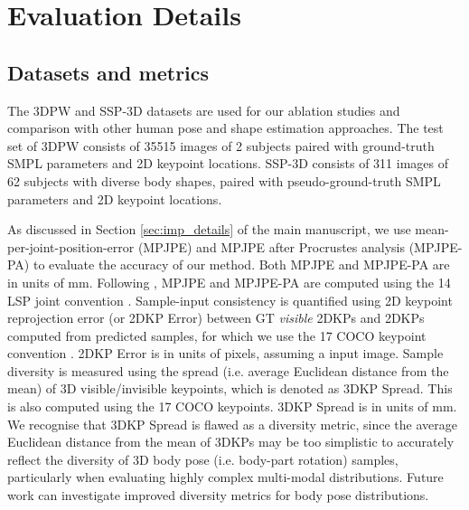 \section{Evaluation Details}
\label{sec:supmat_eval_details}

\subsection{Datasets and metrics}

The 3DPW \cite{vonMarcard2018} and SSP-3D \cite{STRAPS2020BMVC} datasets are used for our ablation studies and comparison with other human pose and shape estimation approaches. The test set of 3DPW consists of 35515 images of 2 subjects paired with ground-truth SMPL parameters and 2D keypoint locations. SSP-3D consists of 311 images of 62 subjects with diverse body shapes, paired with pseudo-ground-truth SMPL parameters and 2D keypoint locations.

As discussed in Section \ref{sec:imp_details} of the main manuscript, we use mean-per-joint-position-error (MPJPE) and MPJPE after Procrustes analysis (MPJPE-PA) to evaluate the accuracy of our method. Both MPJPE and MPJPE-PA are in units of mm. Following \cite{hmrKanazawa17, kolotouros2019spin, kolotouros2019cmr, kolotouros2021prohmr}, MPJPE and MPJPE-PA are computed using the 14 LSP joint convention \cite{Johnson11lsp}. Sample-input consistency is quantified using 2D keypoint reprojection error (or 2DKP Error) between GT \textit{visible} 2DKPs and 2DKPs computed from predicted samples, for which we use the 17 COCO keypoint convention \cite{Lin2014MicrosoftCC}. 2DKP Error is in units of pixels, assuming a  input image. Sample diversity is measured using the spread (i.e. average Euclidean distance from the mean) of 3D visible/invisible keypoints, which is denoted as 3DKP Spread. This is also computed using the 17 COCO keypoints. 3DKP Spread is in units of mm. We recognise that 3DKP Spread is flawed as a diversity metric, since the  average Euclidean distance from the mean of 3DKPs may be too simplistic to accurately reflect the diversity of 3D body pose (i.e. body-part rotation) samples, particularly when evaluating highly complex multi-modal distributions. Future work can investigate improved diversity metrics for body pose distributions.

